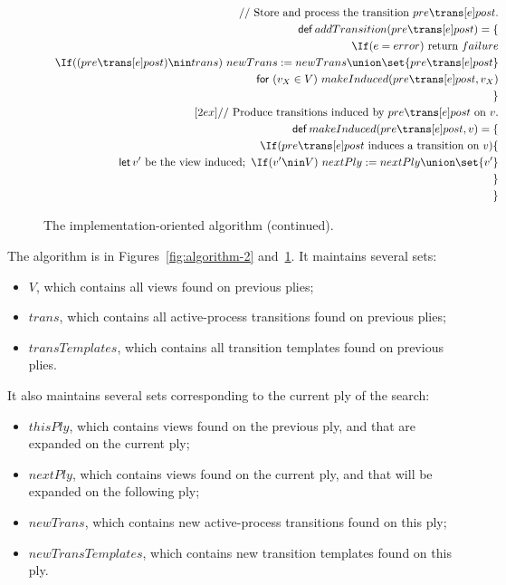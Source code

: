 
\begin{figure}
\[
\begin{align}
\comment{Store and process the transition $pre \trans[e] post$.} \\
\Def addTransition(pre \trans[e] post) = \{ \\
\quad  \If (e = error)\ \mbox{return $failure$} \\
\quad \If ((pre \trans[e] post) \nin trans)\ 
        newTrans := newTrans \union \set{pre \trans[e] post} \\
\quad \For (v_X \in V)\ makeInduced(pre \trans[e] post, v_X) \\
\} 
\\ [2ex]
\comment{Produce transitions induced by $pre \trans[e] post$ on~$v$.} \\
\Def makeInduced(pre \trans[e] post, v) = \{ \\
\quad \If(\mbox{$pre \trans[e] post$ induces a transition on $v$})\{ \\
\qquad \Let v' \mbox{ be the view induced};\
       \If (v' \nin V)\ nextPly := nextPly \union \set{v'} \\
\quad \} \\
\} 
\end{align}
\]
\caption{The implementation-oriented algorithm (continued).}
\label{fig:algorithm-3}
\end{figure}


The algorithm is in Figures~\ref{fig:algorithm-2} and~\ref{fig:algorithm-3}.
It maintains several sets:
%
\begin{itemize}
\item $V$, which contains all views found on previous plies;

\item $trans$, which contains all active-process transitions found on previous
  plies;

\item $transTemplates$, which contains all transition templates found on
  previous plies.
\end{itemize}
%
It also maintains several sets corresponding to the current ply of the search:
%
\begin{itemize}
\item $thisPly$, which contains views found on the previous ply, and that are
  expanded on the current ply;

\item $nextPly$, which contains views found on the current ply, and that will
  be expanded on the following ply;

\item $newTrans$, which contains new active-process transitions found on this
  ply;

\item $newTransTemplates$, which contains new transition templates found on
  this ply.
\end{itemize}

